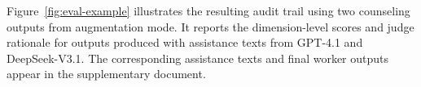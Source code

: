 Figure~\ref{fig:eval-example} illustrates the resulting audit trail using two counseling outputs from augmentation mode. It reports the dimension-level
scores and judge rationale for outputs produced with assistance texts from GPT-4.1 and DeepSeek-V3.1. The corresponding assistance texts and final worker
outputs appear in the supplementary document.


